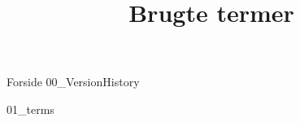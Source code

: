 \documentclass[a4paper,openany]{memoir}
\title{Brugte termer}
\begin{document}
	{Forside}  \newpage
	\tableofcontents\thispagestyle{fancy}
	{00_VersionHistory}  \newpage

	{01_terms}  \newpage

	 {}
	\printbibliography
\end{document}
